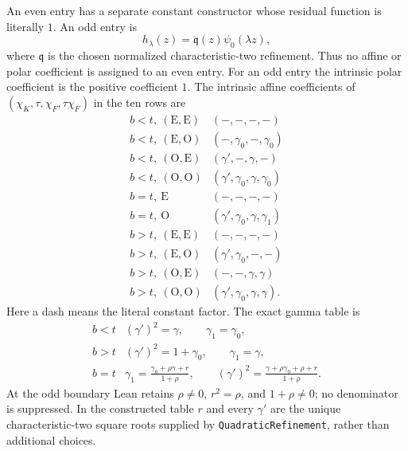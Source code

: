 \begin{definition}
An even entry has a separate constant constructor whose residual function is
literally \(1\).  An odd entry is
\[
 h_\lambda(z)=\mathfrak q(z)\psi _0(\lambda z),
\]
where \(\mathfrak q\) is the chosen normalized characteristic-two
refinement.  Thus no affine or polar coefficient is assigned to an even
entry.  For an odd entry the intrinsic polar coefficient is the positive
coefficient \(1\).  The intrinsic affine coefficients of
\((\chi_K,\tau,\chi_F,\tau\chi_F)\) in the ten rows are
\[
\begin{array}{c|c}
b<t,\ (\mathrm E,\mathrm E)&(-,-,-,-)\\
b<t,\ (\mathrm E,\mathrm O)&(-,\gamma _0,-,\gamma _0)\\
b<t,\ (\mathrm O,\mathrm E)&(\gamma',-,\gamma,-)\\
b<t,\ (\mathrm O,\mathrm O)&(\gamma',\gamma _0,\gamma,\gamma _0)\\
b=t,\ \mathrm E&(-,-,-,-)\\
b=t,\ \mathrm O&(\gamma',\gamma _0,\gamma,\gamma _1)\\
b>t,\ (\mathrm E,\mathrm E)&(-,-,-,-)\\
b>t,\ (\mathrm E,\mathrm O)&(\gamma',\gamma _0,-,-)\\
b>t,\ (\mathrm O,\mathrm E)&(-,-,\gamma,\gamma)\\
b>t,\ (\mathrm O,\mathrm O)&(\gamma',\gamma _0,\gamma,\gamma).
\end{array}
\]
Here a dash means the literal constant factor.  The exact gamma table is
\[
\begin{array}{c|c}
b<t&(\gamma')^2=\gamma,\qquad\gamma _1=\gamma _0,\\
b>t&(\gamma')^2=1+\gamma _0,\qquad\gamma _1=\gamma,\\
b=t&\displaystyle
 \gamma _1=\frac{\gamma _0+\rho\gamma+r}{1+\rho},\qquad
 (\gamma')^2=\frac{\gamma+\rho\gamma _0+\rho+r}{1+\rho}.
\end{array}
\]
At the odd boundary Lean retains
\(\rho\ne0\), \(r^2=\rho\), and \(1+\rho\ne0\); no denominator is
suppressed.  In the constructed table \(r\) and every \(\gamma'\) are the
unique characteristic-two square roots supplied by
\texttt{QuadraticRefinement}, rather than additional choices.


\end{definition}
